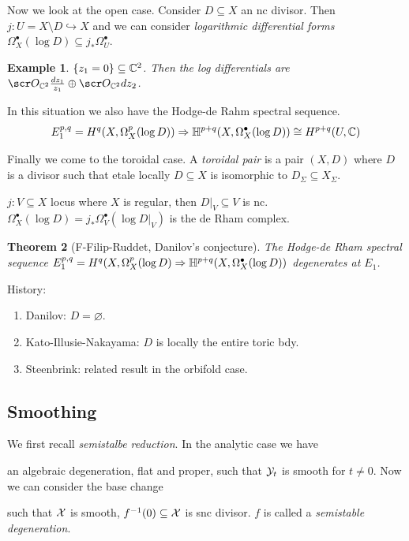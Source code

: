 \documentclass[A4paper, british]{amsart}
\theoremstyle{darkgreentheorem}
\newtheorem{thm}{Theorem}[section]
\theoremstyle{darkbluedefinition}
\theoremstyle{darkredexample}
\newtheorem{exa}[thm]{Example}
\theoremstyle{remark}
\newcommand{\1}{\mathbbm{1}}
\newcommand{\op}{\oplus}
\newcommand{\grd}{^{\bullet}}
\newcommand{\sub}{\subseteq}
\newcommand{\mono}{\hookrightarrow}
\begin{document}
Now we look at the open case.
Consider $D\sub X$ an nc divisor.
Then $j\colon U=X\setminus D\mono X$ and we can consider \textit{logarithmic differential forms} $\Omega_{X}\grd(\log{D})\sub j_{*}\Omega_{U}\grd$.

\begin{exa}
    $\{ z_{1}=0\}\sub \C^{2}$.
    Then the log differentials are $\O_{\C^{2}}\frac{dz_{1}}{z_{1}}\op \O_{\C^{2}}dz_{2}$.
\end{exa}

In this situation we also have the Hodge-de Rahm spectral sequence.
\[ E_{1}^{p,q}=H^{q}(X,\Omega_{X}^{p}(\log{D}))\Rightarrow \bbH^{p+q}(X,\Omega_{X}\grd(\log{D}))\cong H^{p+q}(U,\C) \]

Finally we come to the toroidal case.
A \textit{toroidal pair} is a pair $(X,D)$ where $D$ is a divisor such that etale locally $D\sub X$ is isomorphic to $D_{\Sigma}\sub X_{\Sigma}$.

$j\colon V\sub X$ locus where $X$ is regular, then $D|_{V}\sub V$ is nc.
$\Omega_{X}\grd(\log{D})=j_{*}\Omega_{V}\grd(\log{D|_{V}})$ is the de Rham complex.

\begin{thm}[F-Filip-Ruddet, Danilov's conjecture]
    The Hodge-de Rham spectral sequence $E_{1}^{p,q}=H^{q}(X,\Omega_{X}^{p}(\log{D})\Rightarrow \bbH^{p+q}(X,\Omega_{X}\grd(\log{D})) $ degenerates at $E_{1}$.
\end{thm}

History:
\begin{enumerate}
	\item Danilov: $D=\varnothing$.
	\item Kato-Illusie-Nakayama: $D$ is locally the entire toric bdy.
	\item Steenbrink: related result in the orbifold case.
\end{enumerate}

\subsection{Smoothing}

We first recall \textit{semistalbe reduction}.
In the analytic case we have
\begin{center}
\end{center}
an algebraic degeneration, flat and proper, such that $\mathcal{Y}_{t}$ is smooth for $t\neq 0$.
Now we can consider the base change
\begin{center}
\end{center}
such that $\mathcal{X}$ is smooth, $f^{-1}(0)\sub \X$ is snc divisor.
$f$ is called a \textit{semistable degeneration}.
\end{document}
